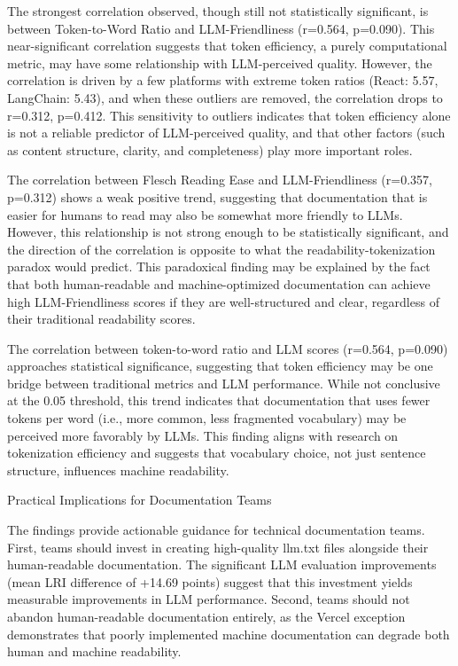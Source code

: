 \documentclass[10pt,conference,a4paper]{IEEEtran}
\makeatletter
\let\oldsubsection\subsection
\renewcommand{\subsection}{%
    \@ifstar{\subsectionStar}{\subsectionNoStar}%
}
\newcommand{\subsectionStar}[1]{%
    \oldsubsection*{\textit{#1}}%
    \vspace{-3pt}%
}
\newcommand{\subsectionNoStar}[1]{%
    \oldsubsection{\textit{#1}}%
    \vspace{-3pt}%
}
\makeatother
\begin{document}
The strongest correlation observed, though still not statistically significant, is between Token-to-Word Ratio and LLM-Friendliness (r=0.564, p=0.090). This near-significant correlation suggests that token efficiency, a purely computational metric, may have some relationship with LLM-perceived quality. However, the correlation is driven by a few platforms with extreme token ratios (React: 5.57, LangChain: 5.43), and when these outliers are removed, the correlation drops to r=0.312, p=0.412. This sensitivity to outliers indicates that token efficiency alone is not a reliable predictor of LLM-perceived quality, and that other factors (such as content structure, clarity, and completeness) play more important roles.

The correlation between Flesch Reading Ease and LLM-Friendliness (r=0.357, p=0.312) shows a weak positive trend, suggesting that documentation that is easier for humans to read may also be somewhat more friendly to LLMs. However, this relationship is not strong enough to be statistically significant, and the direction of the correlation is opposite to what the readability-tokenization paradox would predict. This paradoxical finding may be explained by the fact that both human-readable and machine-optimized documentation can achieve high LLM-Friendliness scores if they are well-structured and clear, regardless of their traditional readability scores.

The correlation between token-to-word ratio and LLM scores (r=0.564, p=0.090) approaches statistical significance, suggesting that token efficiency may be one bridge between traditional metrics and LLM performance. While not conclusive at the 0.05 threshold, this trend indicates that documentation that uses fewer tokens per word (i.e., more common, less fragmented vocabulary) may be perceived more favorably by LLMs. This finding aligns with research on tokenization efficiency and suggests that vocabulary choice, not just sentence structure, influences machine readability.

\subsection{Practical Implications for Documentation Teams}

The findings provide actionable guidance for technical documentation teams. First, teams should invest in creating high-quality llm.txt files alongside their human-readable documentation. The significant LLM evaluation improvements (mean LRI difference of +14.69 points) suggest that this investment yields measurable improvements in LLM performance. Second, teams should not abandon human-readable documentation entirely, as the Vercel exception demonstrates that poorly implemented machine documentation can degrade both human and machine readability.
\end{document}
